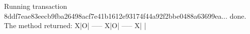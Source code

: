 \begin{shellbox}\begin{ttlst}
Running transaction 8ddf7eae83eecb9fba26498acf7e41b1612e93174f44a92f2bbe0488a63699ea... done.
The method returned:
X|O| 
-----
X|O| 
-----
X| | 
\end{ttlst}\end{shellbox}
